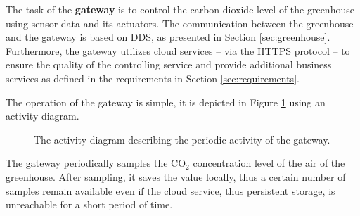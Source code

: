 \documentclass[a4paper, 11pt]{article}
\begin{document}
	The task of the \textbf{gateway} is to control the carbon-dioxide level of the greenhouse using sensor data and  its actuators. The communication between the greenhouse and the gateway is based on DDS, as presented in Section \ref{sec:greenhouse}. Furthermore, the gateway utilizes cloud services -- via the HTTPS protocol -- to ensure the quality of the controlling service and provide additional business services as defined in the requirements in Section \ref{sec:requirements}.	
	
	The operation of the gateway is simple, it is depicted in Figure \ref{fig:activity} using an activity diagram.
	
	\begin{figure}[h!]
		\center
		\caption{The activity diagram describing the periodic activity of the gateway.}
		\label{fig:activity}
	\end{figure}
	
	The gateway periodically samples the CO$_2$ concentration level of the air of the greenhouse. After sampling, it saves the value locally, thus a certain number of samples remain available even if the cloud service, thus persistent storage, is unreachable for a short period of time. 
	
\end{document}
